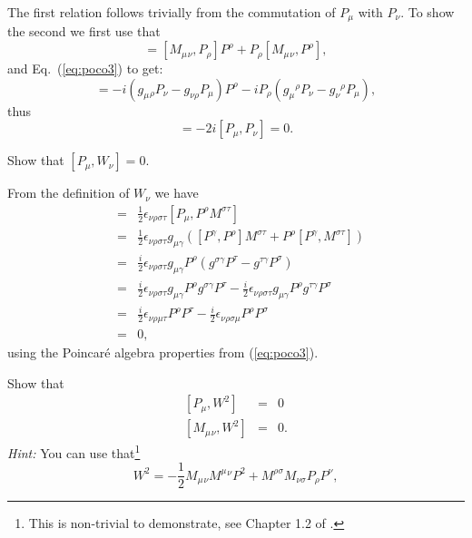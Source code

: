 \documentclass[notes.tex]{subfiles}
\begin{document}
\begin{Answer} 
The first relation follows trivially from the commutation of $P_\mu$ with $P_\nu$. To show the second
we first use that
\begin{equation}[M_\mu{}_\nu, P_\rho P^\rho] = [M_\mu{}_\nu, P_\rho] P^\rho  + P_\rho [M_\mu{}_\nu,  P^\rho],
\end{equation}
and Eq.~(\ref{eq:poco3}) to get:
\begin{equation}
[M_\mu{}_\nu, P_\rho P^\rho] = -i(g_\mu{}_\rho P_\nu - g_{\nu \rho} P_\mu) P^\rho  - iP_\rho (g_\mu{}^\rho P_\nu - g_{\nu}{}^{ \rho} P_\mu),
\end{equation}
thus
\begin{equation}
[M_\mu{}_\nu, P_\rho P^\rho] = -2i[P_\mu, P_\nu] = 0.
\end{equation}
\end{Answer}

\begin{Exercise}[]
Show that $[P_\mu,W_\nu]=0$.
\end{Exercise}

\begin{Answer} 
From the definition of $W_\nu$ we have
\begin{eqnarray*}
[P_\mu,W_\nu] &=& \frac{1}{2}\epsilon_{\nu\rho\sigma\tau}[P_\mu,P^\rho M^{\sigma\tau}] \\
&=& \frac{1}{2}\epsilon_{\nu\rho\sigma\tau}g_{\mu\gamma}([P^\gamma,P^\rho]M^{\sigma\tau} + P^\rho[P^\gamma, M^{\sigma\tau}] )\\
&=& \frac{i}{2}\epsilon_{\nu\rho\sigma\tau}g_{\mu\gamma}P^\rho(g^{\sigma\gamma} P^\tau-g^{\tau\gamma}P^\sigma)\\
&=& \frac{i}{2}\epsilon_{\nu\rho\sigma\tau}g_{\mu\gamma}P^\rho g^{\sigma\gamma} P^\tau-\frac{i}{2}\epsilon_{\nu\rho\sigma\tau}g_{\mu\gamma}P^\rho g^{\tau\gamma}P^\sigma\\
&=& \frac{i}{2}\epsilon_{\nu\rho\mu\tau}P^\rho  P^\tau-\frac{i}{2}\epsilon_{\nu\rho\sigma\mu}P^\rho P^\sigma\\
&=& 0,
\end{eqnarray*}
using the Poincaré algebra properties from (\ref{eq:poco3}).
\end{Answer}


\begin{Exercise}[]
Show that
\begin{eqnarray}
\left[P_\mu, W^2\right] &=& 0 \\
\left[M_\mu{}_\nu, W^2\right] &=& 0.
\end{eqnarray}
{\it Hint:} You can use that\footnote{This is non-trivial to demonstrate, see Chapter 1.2 of \cite{IntrSUSY2010}.}
 \[W^2 = -\frac{1}{2} M_\mu{}_\nu M^{\mu}{}^{\nu}P^2 + M^{\rho\sigma}M_{\nu\sigma}P_\rho P^\nu, \]
\end{Exercise}
\end{document}
